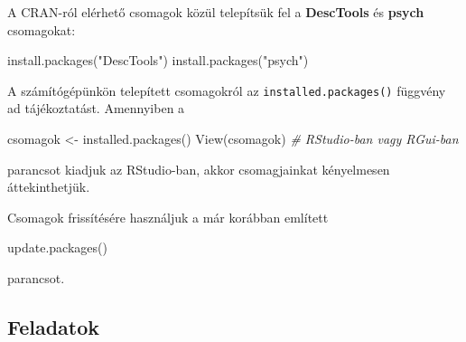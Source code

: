 \documentclass[
]{book}
\newenvironment{Shaded}{\begin{snugshade}}{\end{snugshade}}
\newcommand{\CommentTok}[1]{\textcolor[rgb]{0.56,0.35,0.01}{\textit{#1}}}
\newcommand{\FunctionTok}[1]{\textcolor[rgb]{0.00,0.00,0.00}{#1}}
\newcommand{\NormalTok}[1]{#1}
\newcommand{\OtherTok}[1]{\textcolor[rgb]{0.56,0.35,0.01}{#1}}
\newcommand{\StringTok}[1]{\textcolor[rgb]{0.31,0.60,0.02}{#1}}
\begin{document}
A CRAN-ról elérhető csomagok közül telepítsük fel a \textbf{DescTools} és \textbf{psych} csomagokat:

\begin{Shaded}
\begin{Highlighting}[]
\FunctionTok{install.packages}\NormalTok{(}\StringTok{"DescTools"}\NormalTok{)}
\FunctionTok{install.packages}\NormalTok{(}\StringTok{"psych"}\NormalTok{)}
\end{Highlighting}
\end{Shaded}

A számítógépünkön telepített csomagokról az \texttt{installed.packages()} függvény ad tájékoztatást. Amennyiben a

\begin{Shaded}
\begin{Highlighting}[]
\NormalTok{csomagok }\OtherTok{\textless{}{-}} \FunctionTok{installed.packages}\NormalTok{()}
\FunctionTok{View}\NormalTok{(csomagok)                    }\CommentTok{\# RStudio{-}ban vagy RGui{-}ban}
\end{Highlighting}
\end{Shaded}

parancsot kiadjuk az RStudio-ban, akkor csomagjainkat kényelmesen áttekinthetjük.

Csomagok frissítésére használjuk a már korábban említett

\begin{Shaded}
\begin{Highlighting}[]
\FunctionTok{update.packages}\NormalTok{()}
\end{Highlighting}
\end{Shaded}

parancsot.

\hypertarget{az-r-nyelv-14-exercise}{%
\subsection{Feladatok}\label{az-r-nyelv-14-exercise}}
\end{document}
